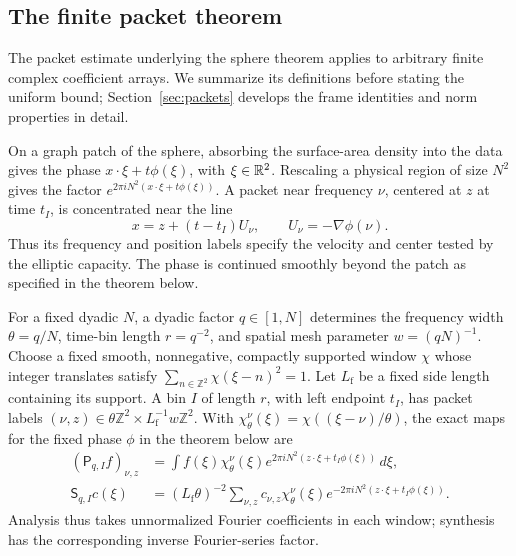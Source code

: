\subsection{The finite packet theorem}

The packet estimate underlying the sphere theorem applies to arbitrary
finite complex coefficient arrays. We summarize its definitions before
stating the uniform bound; Section~\ref{sec:packets} develops the frame
identities and norm properties in detail.

On a graph patch of the sphere, absorbing the surface-area density
into the data gives the phase \(x\cdot\xi+t\phi(\xi)\), with
\(\xi\in\mathbb R^2\). Rescaling a physical region of size \(N^2\) gives
the factor \(e^{2\pi iN^2(x\cdot\xi+t\phi(\xi))}\). A packet near
frequency \(\nu\), centered at \(z\) at time \(t_I\), is concentrated
near the line
\[
 x=z+(t-t_I)U_\nu,\qquad U_\nu=-\nabla\phi(\nu).
\]
Thus its frequency and position labels specify the velocity and
center tested by the elliptic capacity. The phase is continued
smoothly beyond the patch as specified in the theorem below.

For a fixed dyadic \(N\), a dyadic factor \(q\in[1,N]\) determines the
frequency width \(\theta=q/N\), time-bin length \(r=q^{-2}\), and
spatial mesh parameter \(w=(qN)^{-1}\). Choose a fixed smooth,
nonnegative, compactly supported window \(\chi\) whose integer
translates satisfy \(\sum_{n\in\mathbb Z^2}\chi(\xi-n)^2=1\).
Let \(L_{\mathrm f}\) be a fixed side length containing its support.
A bin \(I\) of length \(r\), with left endpoint \(t_I\), has packet
labels \((\nu,z)\in\theta\mathbb Z^2\times
L_{\mathrm f}^{-1}w\mathbb Z^2\). With
\(\chi_\theta^\nu(\xi)=\chi((\xi-\nu)/\theta)\), the exact maps for
the fixed phase \(\phi\) in the theorem below are
\begin{align*}
 (\mathsf P_{q,I}f)_{\nu,z}
 &=\int f(\xi)\chi_\theta^\nu(\xi)
       e^{2\pi iN^2(z\cdot\xi+t_I\phi(\xi))}\,d\xi,\\
 \mathsf S_{q,I}c(\xi)
 &=(L_{\mathrm f}\theta)^{-2}\sum_{\nu,z}
 c_{\nu,z}\chi_\theta^\nu(\xi)
       e^{-2\pi iN^2(z\cdot\xi+t_I\phi(\xi))}.
\end{align*}
Analysis thus takes unnormalized Fourier coefficients in each window;
synthesis has the corresponding inverse Fourier-series factor.

